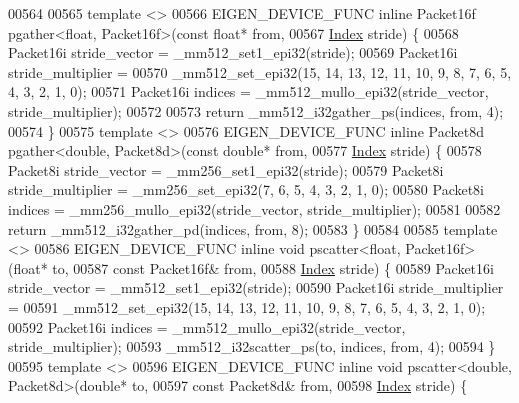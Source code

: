 \begin{DoxyCode}
00564 
00565 \textcolor{keyword}{template} <>
00566 EIGEN\_DEVICE\_FUNC \textcolor{keyword}{inline} Packet16f pgather<float, Packet16f>(\textcolor{keyword}{const} \textcolor{keywordtype}{float}* from,
00567                                                              \hyperlink{namespace_eigen_a62e77e0933482dafde8fe197d9a2cfde}{Index} stride) \{
00568   Packet16i stride\_vector = \_mm512\_set1\_epi32(stride);
00569   Packet16i stride\_multiplier =
00570       \_mm512\_set\_epi32(15, 14, 13, 12, 11, 10, 9, 8, 7, 6, 5, 4, 3, 2, 1, 0);
00571   Packet16i indices = \_mm512\_mullo\_epi32(stride\_vector, stride\_multiplier);
00572 
00573   \textcolor{keywordflow}{return} \_mm512\_i32gather\_ps(indices, from, 4);
00574 \}
00575 \textcolor{keyword}{template} <>
00576 EIGEN\_DEVICE\_FUNC \textcolor{keyword}{inline} Packet8d pgather<double, Packet8d>(\textcolor{keyword}{const} \textcolor{keywordtype}{double}* from,
00577                                                             \hyperlink{namespace_eigen_a62e77e0933482dafde8fe197d9a2cfde}{Index} stride) \{
00578   Packet8i stride\_vector = \_mm256\_set1\_epi32(stride);
00579   Packet8i stride\_multiplier = \_mm256\_set\_epi32(7, 6, 5, 4, 3, 2, 1, 0);
00580   Packet8i indices = \_mm256\_mullo\_epi32(stride\_vector, stride\_multiplier);
00581 
00582   \textcolor{keywordflow}{return} \_mm512\_i32gather\_pd(indices, from, 8);
00583 \}
00584 
00585 \textcolor{keyword}{template} <>
00586 EIGEN\_DEVICE\_FUNC \textcolor{keyword}{inline} \textcolor{keywordtype}{void} pscatter<float, Packet16f>(\textcolor{keywordtype}{float}* to,
00587                                                          \textcolor{keyword}{const} Packet16f& from,
00588                                                          \hyperlink{namespace_eigen_a62e77e0933482dafde8fe197d9a2cfde}{Index} stride) \{
00589   Packet16i stride\_vector = \_mm512\_set1\_epi32(stride);
00590   Packet16i stride\_multiplier =
00591       \_mm512\_set\_epi32(15, 14, 13, 12, 11, 10, 9, 8, 7, 6, 5, 4, 3, 2, 1, 0);
00592   Packet16i indices = \_mm512\_mullo\_epi32(stride\_vector, stride\_multiplier);
00593   \_mm512\_i32scatter\_ps(to, indices, from, 4);
00594 \}
00595 \textcolor{keyword}{template} <>
00596 EIGEN\_DEVICE\_FUNC \textcolor{keyword}{inline} \textcolor{keywordtype}{void} pscatter<double, Packet8d>(\textcolor{keywordtype}{double}* to,
00597                                                          \textcolor{keyword}{const} Packet8d& from,
00598                                                          \hyperlink{namespace_eigen_a62e77e0933482dafde8fe197d9a2cfde}{Index} stride) \{

\end{DoxyCode}
